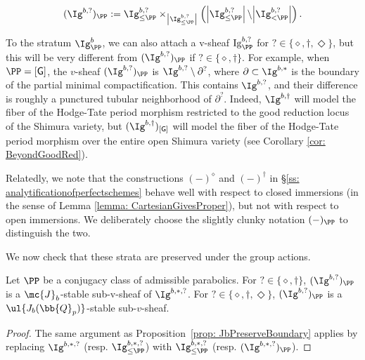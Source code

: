 \documentclass[letterpaper,11pt]{amsart}
\begin{document}
\begin{equation}{\label{eqn: ThickenedBoundaryStrata}}
(\Ig^{b,?})_{\PP}:=\Ig^{b,?}_{\leq\PP}\times_{\left|\Ig^{b,?}_{\leq\PP}\right|}\left(\left|\Ig^{b,?}_{\leq\PP}\right|\backslash{\left|\Ig^{b,?}_{<\PP}\right|}\right).
\end{equation}
\begin{remark}[Warning!]\label{remark: differencestrata}
    To the stratum $\Ig^b_{\PP}$, we can also attach a v-sheaf $\mathrm{Ig}^{b,?}_{\PP}$ for $? \in \{\diamond,\dagger,\Diamond\}$,  but this will be very different from $(\Ig^{b,?})_{\PP}$ if $? \in \{\diamond,\dagger\}$. For example, when $\PP=[\mathsf{G}]$, the $v$-sheaf $(\Ig^{b,?})_{\PP}$ is $\Ig^{b,?} \setminus \partial^{?}$, where $\partial \subset \Ig^{b,*}$ is the boundary of the partial minimal compactification. This contains $\Ig^{b,?}$, and their difference is roughly a punctured tubular neighborhood of $\partial^{?}$. Indeed, $\Ig^{b,\dagger}$ will model the fiber of the Hodge-Tate period morphism restricted to the good reduction locus of the Shimura variety, but $(\Ig^{b,\dagger})_{[\mathsf{G}]}$ will model the fiber of the Hodge-Tate period morphism over the entire open Shimura variety (see Corollary \ref{cor: BeyondGoodRed}). 
    
    Relatedly, we note that the constructions $(-)^{\diamond}$ and $(-)^{\dagger}$ in \S \ref{ss: analytificationofperfectschemes} behave well with respect to closed immersions (in the sense of Lemma \ref{lemma: CartesianGivesProper}), but not with respect to open immersions. We deliberately choose the slightly clunky notation $(-)_{\PP}$ to distinguish the two. 
\end{remark}
We now check that these strata are preserved under the group actions.
\begin{corollary}\label{cor: JbPreserveBoundary}
Let $\PP$ be a conjugacy class of admissible parabolics. For $? \in \{\diamond,\dagger\}$, $(\Ig^{b,?})_{\PP}$ is a $\mc{J}_b$-stable sub-v-sheaf of $\Ig^{b,\ast,?}$. For $? \in \{\diamond,\dagger,\Diamond\}$, $(\Ig^{b,?})_{\PP}$ is a $\ul{J_{b}(\bb{Q}_{p})}$-stable sub-$v$-sheaf. 
\end{corollary}
\begin{proof}
    The same argument as Proposition~\ref{prop: JbPreserveBoundary} applies by replacing $\Ig^{b,*,?}$ (resp. $\Ig^{b,*,?}_{\leq \PP}$) with $\Ig^{b,*,?}_{\leq \PP}$ (resp. $(\Ig^{b,*,?})_{\PP}$). 
\end{proof}
\end{document}
